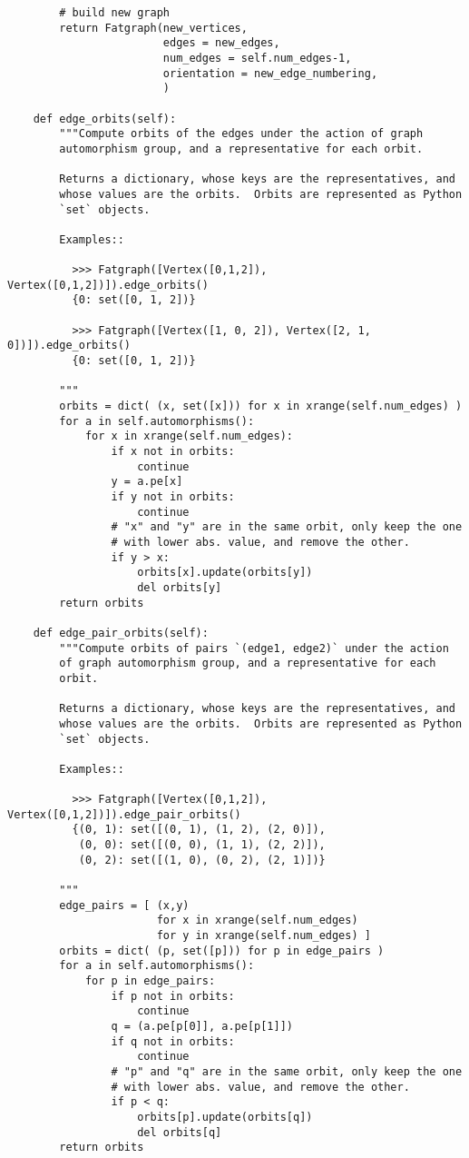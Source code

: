 \begin{lstlisting}
        # build new graph
        return Fatgraph(new_vertices,
                        edges = new_edges,
                        num_edges = self.num_edges-1,
                        orientation = new_edge_numbering,
                        )

    def edge_orbits(self):
        """Compute orbits of the edges under the action of graph
        automorphism group, and a representative for each orbit.
        
        Returns a dictionary, whose keys are the representatives, and
        whose values are the orbits.  Orbits are represented as Python
        `set` objects.

        Examples::

          >>> Fatgraph([Vertex([0,1,2]), Vertex([0,1,2])]).edge_orbits()
          {0: set([0, 1, 2])}

          >>> Fatgraph([Vertex([1, 0, 2]), Vertex([2, 1, 0])]).edge_orbits()
          {0: set([0, 1, 2])}
          
        """
        orbits = dict( (x, set([x])) for x in xrange(self.num_edges) )
        for a in self.automorphisms():
            for x in xrange(self.num_edges):
                if x not in orbits:
                    continue
                y = a.pe[x]
                if y not in orbits:
                    continue
                # "x" and "y" are in the same orbit, only keep the one
                # with lower abs. value, and remove the other.
                if y > x:
                    orbits[x].update(orbits[y])
                    del orbits[y]
        return orbits

    def edge_pair_orbits(self):
        """Compute orbits of pairs `(edge1, edge2)` under the action
        of graph automorphism group, and a representative for each
        orbit.
        
        Returns a dictionary, whose keys are the representatives, and
        whose values are the orbits.  Orbits are represented as Python
        `set` objects.

        Examples::

          >>> Fatgraph([Vertex([0,1,2]), Vertex([0,1,2])]).edge_pair_orbits()
          {(0, 1): set([(0, 1), (1, 2), (2, 0)]),
           (0, 0): set([(0, 0), (1, 1), (2, 2)]),
           (0, 2): set([(1, 0), (0, 2), (2, 1)])}
          
        """
        edge_pairs = [ (x,y) 
                       for x in xrange(self.num_edges)
                       for y in xrange(self.num_edges) ]
        orbits = dict( (p, set([p])) for p in edge_pairs )
        for a in self.automorphisms():
            for p in edge_pairs:
                if p not in orbits:
                    continue
                q = (a.pe[p[0]], a.pe[p[1]])
                if q not in orbits:
                    continue
                # "p" and "q" are in the same orbit, only keep the one
                # with lower abs. value, and remove the other.
                if p < q:
                    orbits[p].update(orbits[q])
                    del orbits[q]
        return orbits



\end{lstlisting}
